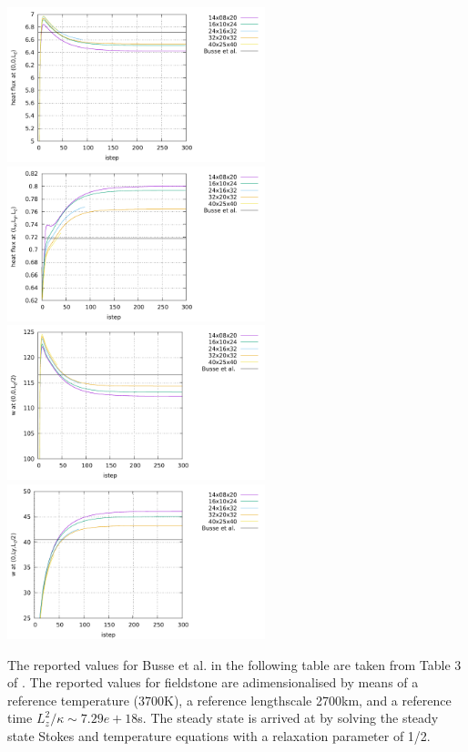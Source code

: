 \begin{center}
\includegraphics[width=7.5cm]{python_codes/fieldstone_20/images/hf1.pdf}
\includegraphics[width=7.5cm]{python_codes/fieldstone_20/images/hf2.pdf}\\
\includegraphics[width=7.5cm]{python_codes/fieldstone_20/images/wmid1.pdf}
\includegraphics[width=7.5cm]{python_codes/fieldstone_20/images/wmid2.pdf}
\end{center}


The reported values for Busse et al. in the following table are taken from Table 3 of \cite{bucc93}.
The reported values for fieldstone are adimensionalised by means of a reference temperature (3700K),
a reference lengthscale 2700km, and a reference time $L_z^2/\kappa\sim 7.29e+18$s.
The steady state is arrived at by solving the steady state Stokes and temperature equations 
with a relaxation parameter of 1/2.



